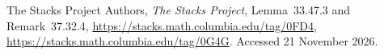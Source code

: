 The Stacks Project Authors, \emph{The Stacks Project},
Lemma~33.47.3 and Remark~37.32.4,
\url{https://stacks.math.columbia.edu/tag/0FD4},
\url{https://stacks.math.columbia.edu/tag/0G4G}.
Accessed 21 November 2026.
